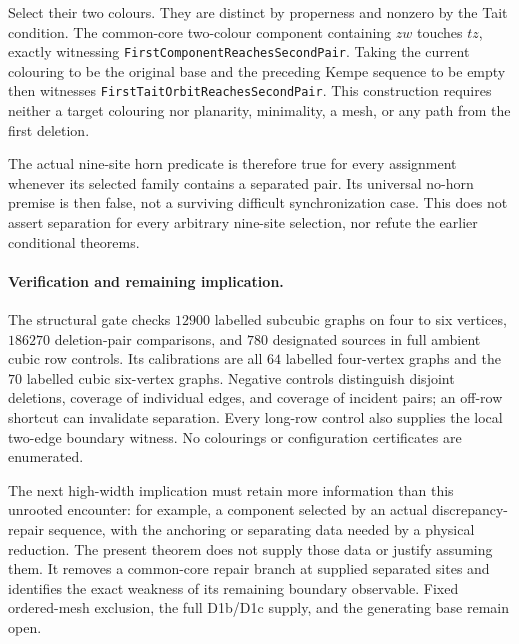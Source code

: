 Select their two colours. They are distinct by properness and nonzero by
the Tait condition. The common-core two-colour component containing $zw$
touches $tz$, exactly witnessing
\texttt{FirstComponentReachesSecondPair}. Taking the current colouring
to be the original base and the preceding Kempe sequence to be empty
then witnesses \texttt{FirstTaitOrbitReachesSecondPair}.
This construction requires neither a target colouring nor planarity,
minimality, a mesh, or any path from the first deletion.

The actual nine-site horn predicate is therefore true for every assignment
whenever its selected family contains a separated pair. Its universal
no-horn premise is then false, not a surviving difficult synchronization
case. This does not assert separation for every arbitrary nine-site
selection, nor refute the earlier conditional theorems.

\paragraph{Verification and remaining implication.}
The structural gate checks $12900$ labelled subcubic graphs on four to
six vertices, $186270$ deletion-pair comparisons, and $780$ designated
sources in full ambient cubic row controls. Its calibrations are all
$64$ labelled four-vertex graphs and the $70$ labelled cubic six-vertex
graphs. Negative controls distinguish disjoint deletions, coverage of
individual edges, and coverage of incident pairs; an off-row shortcut
can invalidate separation. Every long-row control also supplies the
local two-edge boundary witness. No colourings or configuration
certificates are enumerated.

The next high-width implication must retain more information than this
unrooted encounter: for example, a component selected by an actual
discrepancy-repair sequence, with the anchoring or separating data needed
by a physical reduction. The present theorem does not supply those data
or justify assuming them. It removes a common-core repair branch at
supplied separated sites and identifies the exact weakness of its
remaining boundary observable. Fixed ordered-mesh exclusion, the full
D1b/D1c supply, and the generating base remain open.

